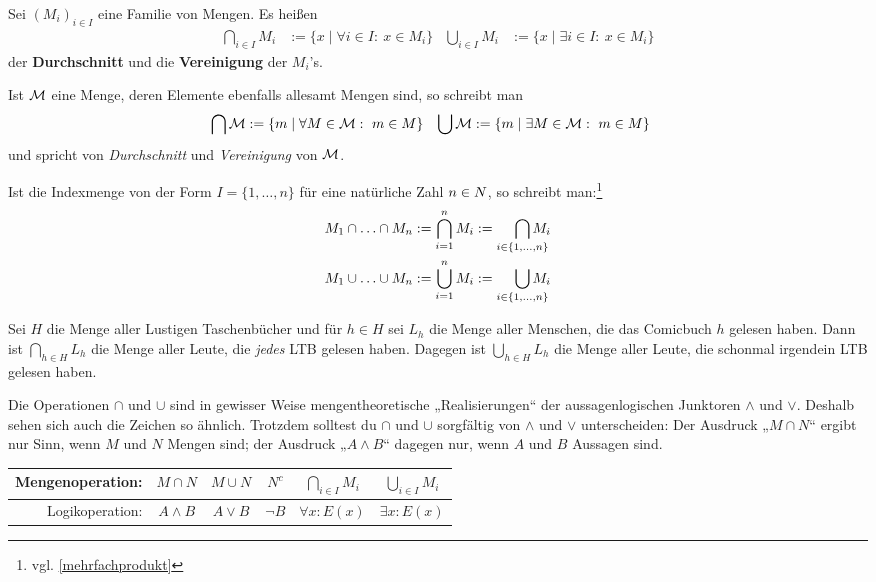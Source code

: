 \begin{defin} \label{def:mehrfachcapcup}
    Sei $(M_i)_{i\in I}$ eine Familie von Mengen. Es heißen
    \begin{align*}
        \bigcap_{i\in I} M_i &:= \{x \mid \forall i\in I:\ x\in M_i\} & \bigcup_{i\in I}M_i &:= \{x \mid \exists i\in I:\ x\in M_i\}
    \end{align*}
    der \textbf{Durchschnitt} und die \textbf{Vereinigung} der $M_i$'s.
    
    Ist $\mathcal M$ eine Menge, deren Elemente ebenfalls allesamt Mengen sind, so schreibt man
    \begin{align*}
        \bigcap \mathcal M & := \{ m \mid \forall M\in \mathcal M:\ m\in M \} & \bigcup \mathcal M & := \{m\mid \exists M\in \mathcal M:\ m\in M \}
    \end{align*}
    und spricht von \emph{Durchschnitt} und \emph{Vereinigung} von $\mathcal M$.
\end{defin}


\begin{nota} \label{alternativmehrfachcapcup}
    Ist die Indexmenge von der Form $I=\{1,\dots,n\}$ für eine natürliche Zahl $n\in \relax N$, so schreibt man:\footnote{vgl. \cref{mehrfachprodukt}}
    \begin{align*}
        M_1\cap \ldots\cap M_n & := \bigcap_{i=1}^n M_i := \smashoperator[r]{\bigcap_{i\in \{1,\dots , n\}}} M_i \\
        M_1\cup \ldots\cup M_n & := \bigcup_{i=1}^n M_i := \smashoperator[r]{\bigcup_{i\in \{1,\dots , n\}}} M_i
    \end{align*}
\end{nota}


\begin{bsp}
    Sei $H$ die Menge aller Lustigen Taschenbücher und für $h\in H$ sei $L_h$ die Menge aller Menschen, die das Comicbuch $h$ gelesen haben. Dann ist $\bigcap_{h\in H} L_h$ die Menge aller Leute, die \emph{jedes} LTB gelesen haben. Dagegen ist $\bigcup_{h\in H} L_h$ die Menge aller Leute, die schonmal irgendein LTB gelesen haben.
\end{bsp}


\begin{bem}
    Die Operationen $\cap$ und $\cup$ sind in gewisser Weise mengentheoretische „Realisierungen“ der aussagenlogischen Junktoren $\land$ und $\lor$. Deshalb sehen sich auch die Zeichen so ähnlich. Trotzdem solltest du $\cap$ und $\cup$ sorgfältig von $\land$ und $\lor$ unterscheiden: Der Ausdruck „$M\cap N$“ ergibt nur Sinn, wenn $M$ und $N$ Mengen sind; der Ausdruck „$A\wedge B$“ dagegen nur, wenn $A$ und $B$ Aussagen sind.
    \begin{center}
    \begin{tabular}{rccccc}
        Mengenoperation: & $M\cap N$ & $M\cup N$ & $N^c$ & $\bigcap_{i\in I} M_i$ & $\bigcup_{i\in I} M_i$ \\ \midrule
        Logikoperation: & $A\land B$ & $A \lor B$ & $\neg B$ & $\forall x: E(x)$ & $\exists x: E(x)$
    \end{tabular}
    \end{center}
\end{bem}


